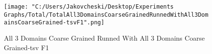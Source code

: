 \documentclass[thesis=M,english]{FITthesis}[2018/05/30]
\begin{document}
		\begin{figure}[!htb]\centering
		\texttt{[image: "C:/Users/Jakovcheski/Desktop/Experiments Graphs/Total/TotalAll3DomainsCoarseGrainedRunnedWithAll3DomainsCoarseGrained-tsvF1".png]}
		\caption{All 3 Domains Coarse Grained Runned With All 3 Domains Coarse Grained-tsv F1}\label{}
	\end{figure}



\begin{conclusion}
%
%
%
%
%
\end{conclusion}
\end{document}
